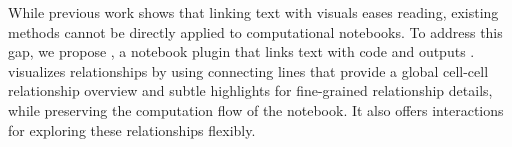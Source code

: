 {While previous work shows that linking text with visuals eases reading, existing methods cannot be directly applied to computational notebooks.
To address this gap, we propose \tool, a notebook plugin that links text with code and outputs . 
\tool visualizes relationships by using connecting lines that provide a global cell-cell relationship overview and subtle highlights for fine-grained relationship details, while preserving the computation flow of the notebook.
It also offers interactions for exploring these relationships flexibly.
}








